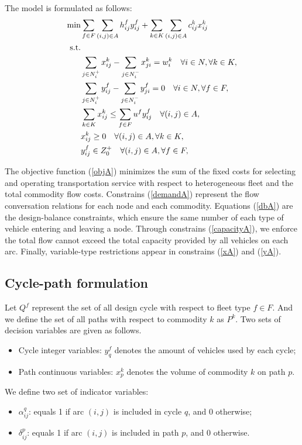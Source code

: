 \documentclass[11pt,nonblindrev,fleqn]{article}
\begin{document}
The model is formulated as follows:
\begin{align}
  \min &  \sum_{f\in F}\sum_{(i,j)\in A}h_{ij}^f y_{ij}^f + \sum_{k\in K}\sum_{(i,j)\in A} c_{ij}^k x_{ij}^k   \label{objA}  \\
  \rm{s.t.} \nonumber  \\
         &  \sum_{j\in N_i^+}x_{ij}^k - \sum_{j\in N_i^-}x_{ji}^k = w_i^k     \quad     \forall i\in N, \forall k\in K,     \label{demandA}  \\
         &   \sum_{j\in N_i^+}y_{ij}^f - \sum_{j\in N_i^-}y_{ji}^f = 0  \quad     \forall i\in N, \forall f\in F,   \label{dbA} \\
         &   \sum_{k\in K}x_{ij}^k \leq \sum_{f\in F}u^f y_{ij}^f  \quad  \forall (i,j)\in A,   \label{capacityA} \\
         &    x_{ij}^k \geq 0  \quad  \forall (i,j)\in A, \forall k\in K,   \label{xA} \\
         &   y_{ij}^f \in Z_0^+  \quad  \forall (i,j)\in A,\forall f\in F, \label{yA}
\end{align}

The objective function (\ref{objA}) minimizes the sum of the fixed costs for selecting and operating transportation service with respect to heterogeneous fleet and the total commodity flow costs. Constrains (\ref{demandA}) represent the flow conversation relations for each node and each commodity. Equations (\ref{dbA}) are the design-balance constraints, which ensure the same number of each type of vehicle entering and leaving a node. Through constrains (\ref{capacityA}), we enforce the total flow cannot exceed the total capacity provided by all vehicles on each arc. Finally, variable-type restrictions appear in constrains (\ref{xA}) and (\ref{yA}).

\subsection{Cycle-path formulation}
Let $Q^f$ represent the set of all design cycle with respect to fleet type $f\in F$. And we define the set of all paths with respect to commodity $k$ as $P^k$. Two sets of decision variables are given as follows.
\begin{itemize}
  \item Cycle integer variables: $y_q^f$ denotes the amount of vehicles used by each cycle;
  \item Path continuous variables: $x_p^k$ denotes the volume of commodity $k$ on path $p$.
\end{itemize}
We define two set of indicator variables:
\begin{itemize}
  \item $\alpha_{ij}^q$: equals 1 if arc $(i,j)$ is included in cycle $q$, and 0 otherwise;
  \item $\delta_{ij}^p$: equals 1 if arc $(i,j)$ is included in path $p$, and 0 otherwise.
\end{itemize}
\end{document}
